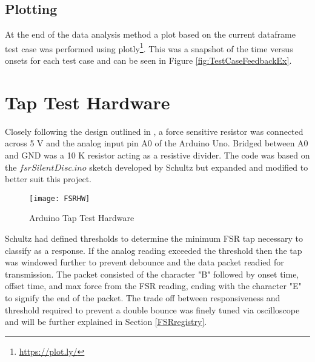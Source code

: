 \subsection{Plotting}
At the end of the data analysis method a plot based on the current dataframe test case was performed using plotly\footnote{\url{https://plot.ly/}}. This was a snapshot of the time versus onsets for each test case and can be seen in Figure \ref{fig:TestCaseFeedbackEx}.

\section{Tap Test Hardware} \label{tap_arduino}
Closely following the design outlined in \cite{schultz2016tap}, a force sensitive resistor was connected across 5 V and the analog input pin A0 of the Arduino Uno. Bridged between A0 and GND was a 10 K resistor acting as a resistive divider. The code was based on the \textit{$fsrSilentDisc.ino$} sketch developed by Schultz but expanded and modified to better suit this project.

\begin{figure}[H]
    \centering
    \texttt{[image: FSRHW]}
    \caption{Arduino Tap Test Hardware}
\end{figure}

Schultz had defined thresholds to determine the minimum FSR tap necessary to classify as a response. If the analog reading exceeded the threshold then the tap was windowed further to prevent debounce and the data packet readied for transmission. The packet consisted of the character "B" followed by onset time, offset time, and max force from the FSR reading, ending with the character "E" to signify the end of the packet. The trade off between responsiveness and threshold required to prevent a double bounce was finely tuned via oscilloscope and will be further explained in Section \ref{FSRregistry}.

